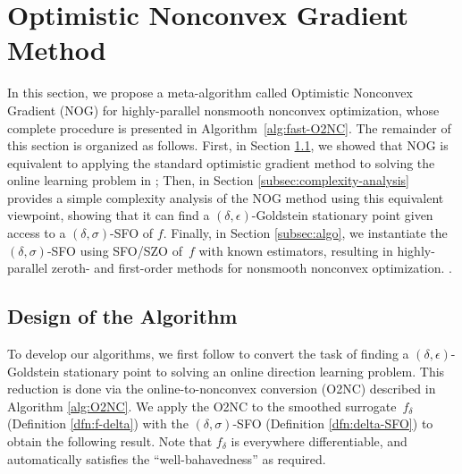 \documentclass{article}
\theoremstyle{definition}
\newtheorem{dfn}{Definition}[section]
\theoremstyle{remark}
\begin{document}
	\section{Optimistic Nonconvex Gradient Method}
	
	In this section, we propose a meta-algorithm called 
	Optimistic Nonconvex Gradient (NOG) for highly-parallel nonsmooth nonconvex optimization, whose complete procedure is presented in Algorithm~\ref{alg:fast-O2NC}.
	The remainder of this section is organized as follows. 
	First, in Section \ref{subsec:rational}, we showed that NOG is equivalent to applying the standard optimistic gradient method \citep{hazan2007online,rakhlin2013online} to solving the online learning problem in \citep{cutkosky2023optimal}; Then, in Section \ref{subsec:complexity-analysis} provides a simple complexity analysis of the NOG method using this equivalent viewpoint, showing that it can find a $(\delta,\epsilon)$-Goldstein stationary point given access to a $(\delta,\sigma)$-SFO of $f$. Finally, in Section \ref{subsec:algo}, we instantiate the $(\delta,\sigma)$-SFO using SFO/SZO of~$f$ with known estimators, resulting in highly-parallel zeroth- and first-order methods for nonsmooth nonconvex optimization.
	.
	\subsection{Design of the Algorithm}
	\label{subsec:rational}
	To develop our algorithms, we first follow \citet{cutkosky2023optimal} to convert the task of finding a $(\delta,\epsilon)$-Goldstein stationary point to solving an online direction learning problem. This reduction is done via the online-to-nonconvex conversion (O2NC) described in Algorithm \ref{alg:O2NC}. We apply the O2NC \citep{cutkosky2023optimal} to 
	the smoothed surrogate~$f_{\delta}$ (Definition \ref{dfn:f-delta}) with the $(\delta,\sigma)$-SFO (Definition \ref{dfn:delta-SFO}) to obtain the following result. Note that $f_{\delta}$ is everywhere differentiable, and automatically satisfies the ``well-bahavedness'' \citep[Definition 1]{cutkosky2023optimal} as required.
	
	
\end{document}
